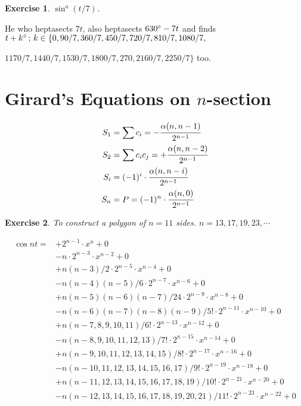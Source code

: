 \documentclass[11pt,a4paper]{article}
\newtheorem{exercise}{Exercise}
\begin{document}
\begin{exercise}
$\sin^a (t/7)$.
\end{exercise}

He who heptasects $7t$, also heptasects $630\degree - 7t$ and finds $t + k \degree\,;\, k \in \{0, 90/7, 360/7, 450/7, 720/7, 810/7, 1080/7,$

$1170/7, 1440/7, 1530/7, 1800/7, 270, 2160/7, 2250/7 \}$ too.

\section{Girard's Equations on $n$-section}

\begin{align}
S_1 &= \sum c_i = - \cfrac{\alpha(n, n - 1)}{2^{n - 1}} \\
S_2 &= \sum c_i c_j = + \cfrac{\alpha(n, n - 2)}{2^{n - 1}} \\
S_i &= (-1)^i \cdot \cfrac{\alpha(n, n - i)}{2^{n - 1}} \\
S_n &= P = (-1)^n \cdot \cfrac{\alpha(n, 0)}{2^{n - 1}}
\end{align}

\begin{exercise}
To construct a polygon of $n = 11$ sides. $n = 13, 17, 19, 23, \cdots$
\end{exercise}

\begin{align}
\cos nt = &+ 2^{n - 1} \cdot x^n + 0 \\
&- n \cdot 2^{n - 3} \cdot x^{n - 2} + 0 \\
&+ n(n-3)/2 \cdot 2^{n - 5} \cdot x^{n - 4} + 0 \\
&- n(n-4)(n-5)/6 \cdot 2^{n - 7} \cdot x^{n - 6} + 0 \\
&+ n(n-5)(n-6)(n-7)/24 \cdot 2^{n - 9} \cdot x^{n - 8} + 0 \\
&- n(n-6)(n-7)(n-8)(n-9)/5! \cdot 2^{n - 11} \cdot x^{n - 10} + 0 \\
&+ n(n-7,8,9,10,11)/6! \cdot 2^{n - 13} \cdot x^{n - 12} + 0 \\
&- n(n-8,9,10,11,12,13)/7! \cdot 2^{n - 15} \cdot x^{n - 14} + 0 \\
&+ n(n-9,10,11,12,13,14,15)/8! \cdot 2^{n - 17} \cdot x^{n - 16} + 0 \\
&- n(n-10,11,12,13,14,15,16,17)/9! \cdot 2^{n - 19} \cdot x^{n - 18} + 0 \\
&+ n(n-11,12,13,14,15,16,17,18,19)/10! \cdot 2^{n - 21} \cdot x^{n - 20} + 0 \\
&- n(n-12,13,14,15,16,17,18,19,20,21)/11! \cdot 2^{n - 23} \cdot x^{n - 22} + 0
\end{align}
\end{document}
